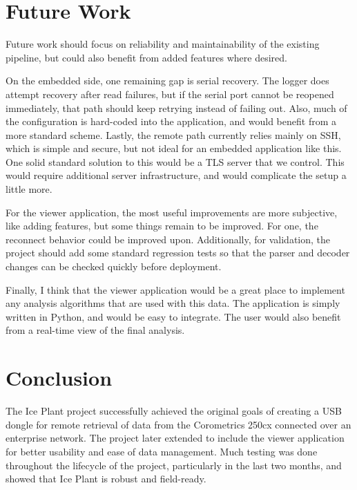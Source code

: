 \documentclass[11pt]{article}
\begin{document}
\section{Future Work}
Future work should focus on reliability and maintainability of the existing pipeline, but could also benefit from added features where desired. 

On the embedded side, one remaining gap is serial recovery. The logger does attempt recovery after read failures, but if the serial port cannot be reopened immediately, that path should keep retrying instead of failing out. Also, much of the configuration is hard-coded into the application, and would benefit from a more standard scheme. Lastly, the remote path currently relies mainly on SSH, which is simple and secure, but not ideal for an embedded application like this. One solid standard solution to this would be a TLS server that we control. This would require additional server infrastructure, and would complicate the setup a little more.

For the viewer application, the most useful improvements are more subjective, like adding features, but some things remain to be improved. For one, the reconnect behavior could be improved upon. Additionally, for validation, the project should add some standard regression tests so that the parser and decoder changes can be checked quickly before deployment.

Finally, I think that the viewer application would be a great place to implement any analysis algorithms that are used with this data. The application is simply written in Python, and would be easy to integrate. The user would also benefit from a real-time view of the final analysis. 

\section{Conclusion}
The Ice Plant project successfully achieved the original goals of creating a USB dongle for remote retrieval of data from the Corometrics 250cx connected over an enterprise network. The project later extended to include the viewer application for better usability and ease of data management. Much testing was done throughout the lifecycle of the project, particularly in the last two months, and showed that Ice Plant is robust and field-ready. 
\end{document}
